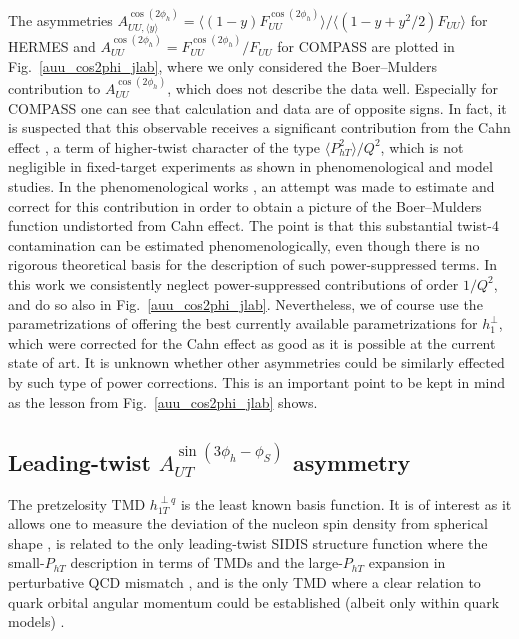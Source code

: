 \documentclass[a4paper,11pt]{article}
\newcommand{\la}{\langle}
\newcommand{\ra}{\rangle}
\def\Phperp{P_{hT}}
\begin{document}
The asymmetries  $A_{UU, \langle y\rangle}^{\cos(2\phi_h)}=\langle(1-y)F_{UU}^{\cos(2\phi_h)}\rangle/\langle(1-y + y^2/2)F_{UU}\rangle$
for HERMES \cite{Airapetian:2012yg} and $A_{UU}^{\cos(2\phi_h)}=F_{UU}^{\cos(2\phi_h)}/F_{UU}$ for COMPASS \cite{Adolph:2014pwc}
are plotted in Fig.~\ref{auu_cos2phi_jlab}, where we only considered the
Boer--Mulders contribution to $A_{UU}^{\cos(2\phi_h)}$, which does not describe
the data well. Especially for COMPASS one can see that calculation and
data are of opposite signs. In fact, it is suspected that this observable
receives a significant contribution from the Cahn effect \cite{Cahn:1978se},
a term of higher-twist character of the type $\la\Phperp^2\ra/Q^2$, which
is not negligible in fixed-target experiments as shown in
phenomenological \cite{Schweitzer:2010tt} and model \cite{Cao:2018qqf} studies.
In the phenomenological works
\cite{Barone:2009hw,Barone:2010gk,Barone:2015ksa}, an attempt was
made to estimate and correct for this contribution in order
to obtain a picture of the Boer--Mulders function undistorted
from Cahn effect. The point is that this substantial twist-4 contamination
can be estimated phenomenologically, even though there is no rigorous
theoretical basis for the description of such power-suppressed terms.
In this work we consistently neglect power-suppressed contributions of
order $1/Q^2$, and do so also in Fig.~\ref{auu_cos2phi_jlab}.
Nevertheless, we of course use the parametrizations of
\cite{Barone:2009hw,Barone:2010gk,Barone:2015ksa} offering
the best currently available parametrizations for $h_1^{\perp}$,
which were corrected for the Cahn effect as good as it is possible at
the current state of art. It is unknown whether other asymmetries
could be similarly effected by such type of power corrections.
This is an important point to be kept in mind as the lesson
from Fig.~\ref{auu_cos2phi_jlab} shows.



\subsection{\boldmath Leading-twist $A_{UT}^{\sin(3\phi_h-\phi_S)}$  asymmetry}
\label{Sec-5.6:pretzel-basis}

The pretzelosity TMD $h_{1T}^{\perp q}$ is the least known basis
function. It is of interest as it allows one to measure the deviation
of the nucleon spin density from spherical shape \cite{Miller:2007ae},
is related to the only leading-twist SIDIS structure function where the
small-$P_{hT}$ description in terms of TMDs and the large-$P_{hT}$ expansion
in perturbative QCD mismatch \cite{Bacchetta:2008xw}, and is the only TMD
where a clear relation to quark orbital angular momentum
could be established (albeit only within quark models)
\cite{Avakian:2008dz,She:2009jq,Avakian:2010br,Lorce:2011kn}.
\end{document}
